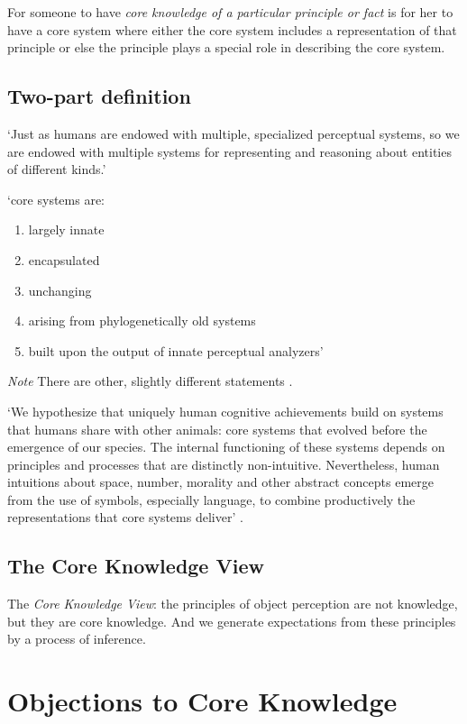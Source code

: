 \documentclass[12pt]{extarticle}
\begin{document}
\begin{multicols}{3}
For someone to have \textit{core knowledge of a particular principle or
fact} is for her to have a core system where
either the core system includes a representation of that principle or
else the principle plays a special role in describing the core system.

\subsection{Two-part definition}

‘Just as humans are endowed with multiple, specialized perceptual systems,
so we are endowed with multiple systems for representing and reasoning
about entities of different kinds.’
\citep[p.\ 517]{Carey:1996hl}

‘core systems are:
\begin{enumerate}
\item largely innate
\item encapsulated
\item unchanging
\item arising from phylogenetically old systems
\item built upon the output of innate perceptual analyzers’ \citep[p.\ 520]{Carey:1996hl}
\end{enumerate}

\textit{Note} There are other, slightly different statements
\citep[e.g.][]{carey:2009_origin}.

‘We hypothesize that uniquely human cognitive achievements build on systems
that humans share with other animals: core systems that evolved before the
emergence of our species.
The internal functioning of these systems depends on principles and processes
that are distinctly non-intuitive.
Nevertheless, human intuitions about space, number, morality and other
abstract concepts emerge from the use of symbols, especially language, to
combine productively the representations that core systems deliver’
\citep[pp.\ 2784-5]{spelke:2012_core}.

\subsection{The Core Knowledge View}

The \emph{Core Knowledge View}: the principles of object perception are not
knowledge, but they are core knowledge. And we generate expectations from
these principles by a process of inference.



\section{Objections to Core Knowledge}


\end{multicols}
\end{document}
